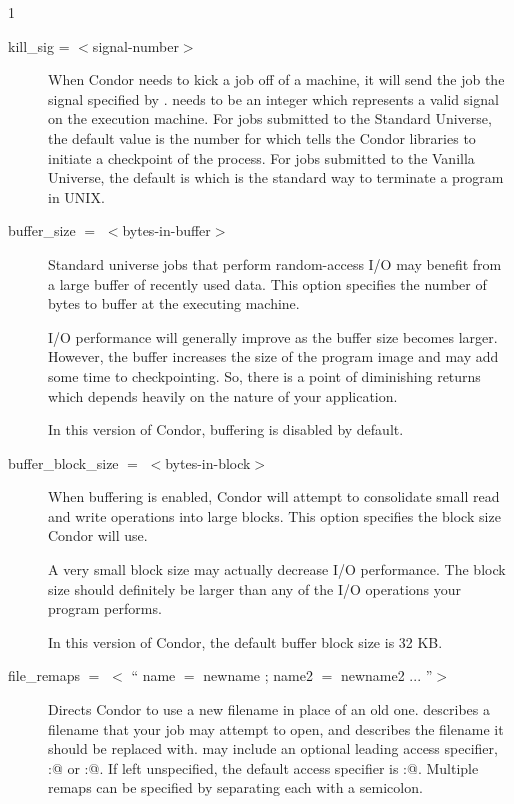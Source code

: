 \begin{ManPage}{\label{man-condor-submit}}{1}
\begin{description}

\item[kill\_sig = $<$signal-number$>$] When Condor needs to kick a job
off of a machine, it will send the job the signal specified by
.   needs to be an integer which
represents a valid signal on the execution machine.  For jobs submitted
to the Standard Universe, the default value is the number for
\verb@SIGTSTP@ which tells the Condor libraries to initiate a checkpoint
of the process.  For jobs submitted to the Vanilla Universe, the default 
is \verb@SIGTERM@ which is the standard way to terminate a program in UNIX.  


\item[buffer\_size $=$ $<$bytes-in-buffer$>$]
Standard universe jobs that perform random-access I/O may benefit from a
large buffer of recently used data.  This option specifies the number of
bytes to buffer at the executing machine.

I/O performance will generally improve as the buffer size becomes larger.
However, the buffer increases the size of the program image and may add
some time to checkpointing.  So, there is a point of diminishing returns
which depends heavily on the nature of your application.

In this version of Condor, buffering is disabled by default.


\item[buffer\_block\_size $=$ $<$bytes-in-block$>$]
When buffering is enabled, Condor will attempt to consolidate small read
and write operations into large blocks.  This option specifies the block
size Condor will use.

A very small block size may actually decrease I/O performance.
The block size should definitely be larger than any of the I/O operations
your program performs.

In this version of Condor, the default buffer block size is 32 KB.


\item[file\_remaps $=$ $<$ `` name $=$ newname ; name2 $=$ newname2 ... ''$>$ ]
Directs Condor to use a new filename in place of an old one.  
describes a filename that your job may attempt to open, and 
describes the filename it should be replaced with.
 may include an optional leading
access specifier, \verb@local:@ or \verb@remote:@.  If left unspecified,
the default access specifier is \verb@remote:@.  Multiple remaps can be 
specified by separating each with a semicolon.


\end{description}
\end{ManPage}
